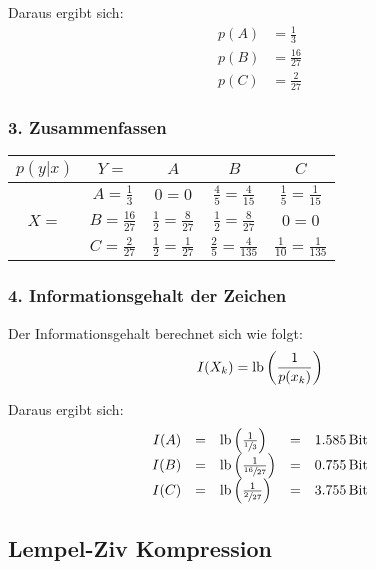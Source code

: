 Daraus ergibt sich:
\begin{align*}
	p(A) &= \frac{1}{3} \\
	p(B) &= \frac{16}{27} \\
	p(C) &= \frac{2}{27}
\end{align*}


\subsubsection*{3. Zusammenfassen}

\begin{tabular}[H]{|c|c|c|c|c|}
	\hline
	$p(y|x)$ & $Y=$ & $A$ & $B$ & $C$ \\
	\hline
	\multirow{3}{*}{$X=$} & $A = \frac{1}{3}$ & $0 = 0$ & $\frac{4}{5} = \frac{4}{15}$ & $\frac{1}{5} = \frac{1}{15}$ \\
	\cline{2-5}
	& $B = \frac{16}{27}$ & $\frac{1}{2} = \frac{8}{27}$ & $\frac{1}{2} = \frac{8}{27}$ & $0 = 0$ \\
	\cline{2-5}
	& $C = \frac{2}{27}$ & $\frac{1}{2} = \frac{1}{27}$ & $\frac{2}{5} = \frac{4}{135}$ & $\frac{1}{10} = \frac{1}{135}$ \\
	\hline
\end{tabular}


\subsubsection*{4. Informationsgehalt der Zeichen}

Der Informationsgehalt berechnet sich wie folgt:
\[
	I(X_k) = \operatorname{lb}\left(\frac{1}{p(x_k)}\right)
\]

Daraus ergibt sich:
{%
	\renewcommand{\arraystretch}{2}
	\begin{equation*}
		\begin{array}{rclcl}
			I(A) &=& \operatorname{lb}\left(\frac{1}{\sfrac{1}{3}}\right) &=& 1.585 \, \textrm{Bit} \\
			I(B) &=& \operatorname{lb}\left(\frac{1}{\sfrac{16}{27}}\right) &=& 0.755 \, \textrm{Bit} \\
			I(C) &=& \operatorname{lb}\left(\frac{1}{\sfrac{2}{27}}\right) &=& 3.755 \, \textrm{Bit}
		\end{array}
	\end{equation*}
}%


\subsection{Lempel-Ziv Kompression}
\label{example:lempel-ziv}


